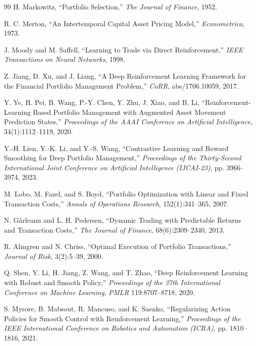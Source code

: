 \documentclass[10pt,twocolumn]{article}
\begin{document}
\begin{thebibliography}{99}
H. Markowitz, ``Portfolio Selection,'' \emph{The Journal of Finance}, 1952.

R. C. Merton, ``An Intertemporal Capital Asset Pricing Model,'' \emph{Econometrica}, 1973.

J. Moody and M. Saffell, ``Learning to Trade via Direct Reinforcement,'' \emph{IEEE Transactions on Neural Networks}, 1998.

Z. Jiang, D. Xu, and J. Liang, ``A Deep Reinforcement Learning Framework for the Financial Portfolio Management Problem,'' \emph{CoRR}, abs/1706.10059, 2017.

Y. Ye, H. Pei, B. Wang, P.-Y. Chen, Y. Zhu, J. Xiao, and B. Li, ``Reinforcement-Learning Based Portfolio Management with Augmented Asset Movement Prediction States,'' \emph{Proceedings of the AAAI Conference on Artificial Intelligence}, 34(1):1112--1119, 2020.

Y.-H. Lien, Y.-K. Li, and Y.-S. Wang, ``Contrastive Learning and Reward Smoothing for Deep Portfolio Management,'' \emph{Proceedings of the Thirty-Second International Joint Conference on Artificial Intelligence (IJCAI-23)}, pp. 3966--3974, 2023.

M. Lobo, M. Fazel, and S. Boyd, ``Portfolio Optimization with Linear and Fixed Transaction Costs,'' \emph{Annals of Operations Research}, 152(1):341--365, 2007.

N. G\^arleanu and L. H. Pedersen, ``Dynamic Trading with Predictable Returns and Transaction Costs,'' \emph{The Journal of Finance}, 68(6):2309--2340, 2013.

R. Almgren and N. Chriss, ``Optimal Execution of Portfolio Transactions,'' \emph{Journal of Risk}, 3(2):5--39, 2000.

Q. Shen, Y. Li, H. Jiang, Z. Wang, and T. Zhao, ``Deep Reinforcement Learning with Robust and Smooth Policy,'' \emph{Proceedings of the 37th International Conference on Machine Learning}, \emph{PMLR} 119:8707--8718, 2020.

S. Mysore, B. Mabsout, R. Mancuso, and K. Saenko, ``Regularizing Action Policies for Smooth Control with Reinforcement Learning,'' \emph{Proceedings of the IEEE International Conference on Robotics and Automation (ICRA)}, pp. 1810--1816, 2021.
\end{thebibliography}
\end{document}
